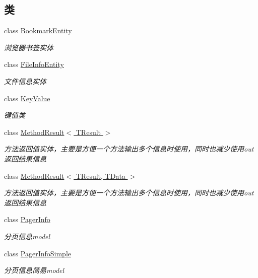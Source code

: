 \subsection*{类}
\begin{DoxyCompactItemize}
\item 
class \hyperlink{class_x_c_l_net_tools_1_1_entity_1_1_bookmark_entity}{Bookmark\-Entity}
\begin{DoxyCompactList}\small\item\em 浏览器书签实体 \end{DoxyCompactList}\item 
class \hyperlink{class_x_c_l_net_tools_1_1_entity_1_1_file_info_entity}{File\-Info\-Entity}
\begin{DoxyCompactList}\small\item\em 文件信息实体 \end{DoxyCompactList}\item 
class \hyperlink{class_x_c_l_net_tools_1_1_entity_1_1_key_value}{Key\-Value}
\begin{DoxyCompactList}\small\item\em 键值类 \end{DoxyCompactList}\item 
class \hyperlink{class_x_c_l_net_tools_1_1_entity_1_1_method_result_3_01_t_result_01_4}{Method\-Result$<$ T\-Result $>$}
\begin{DoxyCompactList}\small\item\em 方法返回值实体，主要是方便一个方法输出多个信息时使用，同时也减少使用out返回结果信息 \end{DoxyCompactList}\item 
class \hyperlink{class_x_c_l_net_tools_1_1_entity_1_1_method_result_3_01_t_result_00_01_t_data_01_4}{Method\-Result$<$ T\-Result, T\-Data $>$}
\begin{DoxyCompactList}\small\item\em 方法返回值实体，主要是方便一个方法输出多个信息时使用，同时也减少使用out返回结果信息 \end{DoxyCompactList}\item 
class \hyperlink{class_x_c_l_net_tools_1_1_entity_1_1_pager_info}{Pager\-Info}
\begin{DoxyCompactList}\small\item\em 分页信息model \end{DoxyCompactList}\item 
class \hyperlink{class_x_c_l_net_tools_1_1_entity_1_1_pager_info_simple}{Pager\-Info\-Simple}
\begin{DoxyCompactList}\small\item\em 分页信息简易model \end{DoxyCompactList}\item 

\end{DoxyCompactItemize}
